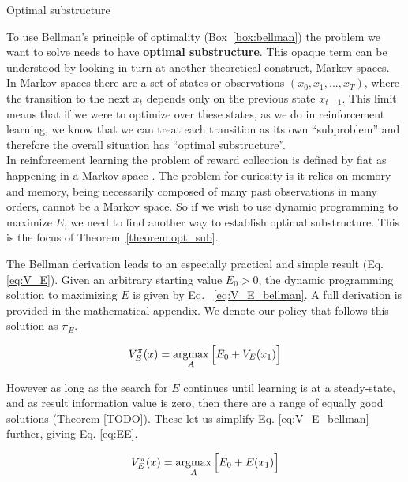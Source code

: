 \begin{featurebox}
	\caption{Optimal substructure}
	\label{box:substructure}
	To use Bellman's principle of optimality (Box~\ref{box:bellman}) the problem we want to solve needs to have \textbf{optimal substructure}. This opaque term can be understood by looking in turn at another theoretical construct, Markov spaces. 
	\\
	In Markov spaces there are a set of states or observations $(x_0, x_1, ..., x_{T})$, where the transition to the next $x_t$ depends only on the previous state $x_{t-1}$. This limit means that if we were to optimize over these states, as we do in reinforcement learning, we know that we can treat each transition as its own ``subproblem'' and therefore the overall situation has ``optimal substructure''.
	\\
	In reinforcement learning the problem of reward collection is defined by fiat as happening in a Markov space \cite{Sutton2018}. The problem for curiosity is it relies on memory and memory, being necessarily composed of many past observations in many orders, cannot be a Markov space. So if we wish to use dynamic programming to maximize $E$, we need to find another way to establish optimal substructure. This is the focus of Theorem~\ref{theorem:opt_sub}.
	\medskip
\end{featurebox}

The Bellman derivation leads to an especially practical and simple result (Eq. \ref{eq:V_E}). Given an arbitrary starting value $E_0 > 0$, the dynamic programming solution to maximizing $E$ is given by Eq. ~\ref{eq:V_E_bellman}. A full derivation is provided in the mathematical appendix. We denote our policy that follows this solution as $\pi_E$.

\begin{equation}
	\label{eq:V_E_bellman} 
	V^{\pi}_E(x) = \operatorname*{argmax}_A \Big [ E_0 + V_E(x_1) \Big ]
\end{equation}


However as long as the search for $E$ continues until learning is at a steady-state, and as result information value is zero, then there are a range of equally good solutions (Theorem \ref{TODO}). These let us simplify Eq. \ref{eq:V_E_bellman} further, giving Eq. \ref{eq:EE}. 

\begin{equation}
	\label{eq:EE} 
	V^{\pi}_E(x) = \operatorname*{argmax}_A \Big [ E_0 + E(x_1) \Big ]
\end{equation}

